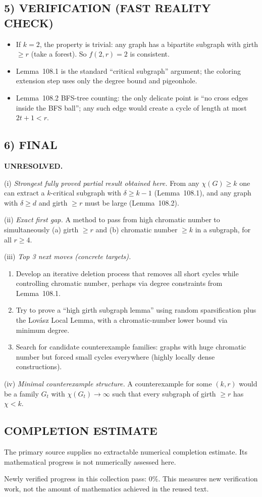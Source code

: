 \subsection*{5) VERIFICATION (FAST REALITY CHECK)}
\begin{itemize}
\item If $k=2$, the property is trivial: any graph has a bipartite subgraph with girth $\ge r$ (take a forest). So $f(2,r)=2$ is consistent.
\item Lemma~108.1 is the standard ``critical subgraph'' argument; the coloring extension step uses only the degree bound and pigeonhole.
\item Lemma~108.2 BFS-tree counting: the only delicate point is ``no cross edges inside the BFS ball''; any such edge would create a cycle of length at most $2t+1<r$.
\end{itemize}

\subsection*{6) FINAL}
\textbf{UNRESOLVED.}

(i) \emph{Strongest fully proved partial result obtained here.}
From any $\chi(G)\ge k$ one can extract a $k$-critical subgraph with $\delta\ge k-1$ (Lemma~108.1), and any graph with $\delta\ge d$ and girth $\ge r$ must be large (Lemma~108.2).

(ii) \emph{Exact first gap.}
A method to pass from high chromatic number to simultaneously (a) girth $\ge r$ and (b) chromatic number $\ge k$ in a subgraph, for all $r\ge4$.

(iii) \emph{Top 3 next moves (concrete targets).}
\begin{enumerate}
\item Develop an iterative deletion process that removes all short cycles while controlling chromatic number, perhaps via degree constraints from Lemma~108.1.
\item Try to prove a ``high girth subgraph lemma'' using random sparsification plus the Lov\'asz Local Lemma, with a chromatic-number lower bound via minimum degree.
\item Search for candidate counterexample families: graphs with huge chromatic number but forced small cycles everywhere (highly locally dense constructions).
\end{enumerate}

(iv) \emph{Minimal counterexample structure.}
A counterexample for some $(k,r)$ would be a family $G_t$ with $\chi(G_t)\to\infty$ such that every subgraph of girth $\ge r$ has $\chi<k$.




\subsection*{COMPLETION ESTIMATE}
The primary source supplies no extractable numerical completion estimate. Its mathematical progress is not numerically assessed here.

Newly verified progress in this collection pass: $0\%$. This measures new verification work, not the amount of mathematics achieved in the reused text.
